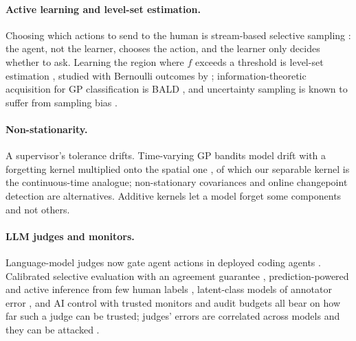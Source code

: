 \documentclass[11pt]{article}
\begin{document}
\paragraph{Active learning and level-set estimation.} Choosing which actions to
send to the human is stream-based selective sampling
\citep{cohn1994improving,settles2009active}: the agent, not the learner,
chooses the action, and the learner only decides whether to ask. Learning the
region where $f$ exceeds a threshold is level-set estimation
\citep{gotovos2013active,bogunovic2016truncated}, studied with Bernoulli
outcomes by \citet{letham2022lookahead}; information-theoretic acquisition for
GP classification is BALD \citep{houlsby2011bayesian}, and uncertainty
sampling is known to suffer from sampling bias
\citep{dasgupta2008hierarchical,dasgupta2011two}.

\paragraph{Non-stationarity.} A supervisor's tolerance drifts. Time-varying GP
bandits model drift with a forgetting kernel multiplied onto the spatial one
\citep{bogunovic2016timevarying}, of which our separable kernel is the
continuous-time analogue; non-stationary covariances
\citep{paciorek2003nonstationary} and online changepoint detection
\citep{adams2007bocd} are alternatives. Additive kernels
\citep{duvenaud2011additive} let a model forget some components and not
others.

\paragraph{LLM judges and monitors.} Language-model judges now gate agent
actions in deployed coding agents \citep{hughes2026automode,openai2026codex}.
Calibrated selective evaluation with an agreement guarantee \citep{jung2025trust},
prediction-powered and active inference from few human labels
\citep{angelopoulos2023ppi,zrnic2024active}, latent-class models of annotator
error \citep{dawid1979maximum,allman2009identifiability}, and AI control with
trusted monitors and audit budgets \citep{greenblatt2024control,bhatt2025ctrlz}
all bear on how far such a judge can be trusted; judges' errors are correlated
across models \citep{kim2025correlated,goel2025great} and they can be attacked
\citep{remedios2026redteaming}.
\end{document}
